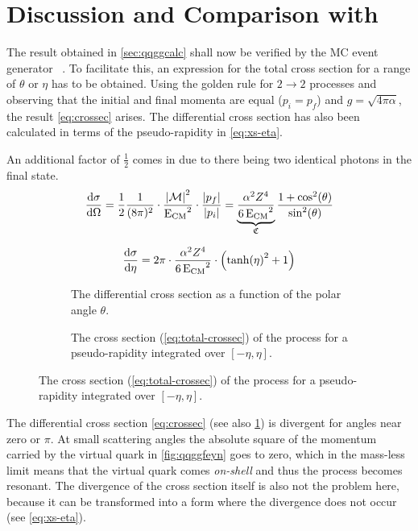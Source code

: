 \section{Discussion and Comparison with \sherpa}%
\label{sec:compsher}

The result obtained in \cref{sec:qqggcalc} shall now be verified by the
MC event generator \sherpa{}~\cite{Gleisberg:2008ta}. To
facilitate this, an expression for the total cross section for a range
of \(\theta\) or \(\eta\) has to be obtained. Using the golden rule
for \(2\rightarrow 2\) processes and observing that the initial and
final momenta are equal (\(p_i=p_f\)) and \(g=\sqrt{4\pi\alpha}\), the
result \cref{eq:crossec} arises. The differential cross section has
also been calculated in terms of the pseudo-rapidity
in \cref{eq:xs-eta}.

An additional factor of \(\frac{1}{2}\) comes in due to there being
two identical photons in the final state.
\begin{equation}
  \label{eq:crossec}
  \dv{\sigma}{\Omega} =
  \frac{1}{2}\frac{1}{(8\pi)^2}\cdot\frac{\abs{\mathcal{M}}^2}{\operatorname{E_{\text{CM}}}^2}\cdot\frac{\abs{p_f}}{\abs{p_i}}
  = \underbrace{\frac{\alpha^2Z^4}{6\operatorname{E_{\text{CM}}}^2}}_{\mathfrak{C}}\frac{1+\cos^2(\theta)}{\sin^2(\theta)}
\end{equation}

\begin{equation}
  \label{eq:xs-eta}
  \dv{\sigma}{\eta} = 2\pi\cdot\frac{\alpha^2Z^4}{6\operatorname{E_{\text{CM}}}^2}\cdot\qty(\tanh(\eta)^2 + 1)
\end{equation}

\begin{figure}[ht]
  \centering
  \begin{subfigure}[c]{.45\textwidth}
    \centering {}
    \caption[Plot of the differential cross section of the \(\qqgg\)
    process.]{\label{fig:diffxs} The differential cross section as a
      function of the polar angle \(\theta\). }
  \end{subfigure}
  \begin{subfigure}[c]{.45\textwidth}
  \centering
  \caption[Plot of the total cross section of the \(\qqgg\)
  process.]{\label{fig:totxs} The cross section
    (\cref{eq:total-crossec}) of the process for a pseudo-rapidity
    integrated over \([-\eta, \eta]\).}
  \end{subfigure}
\end{figure}

The differential cross section \cref{eq:crossec} (see also
\cref{fig:diffxs}) is divergent for angles near zero or \(\pi\). At
small scattering angles the absolute square of the momentum carried by
the virtual quark in \cref{fig:qqggfeyn} goes to zero, which in the
mass-less limit means that the virtual quark comes \emph{on-shell} and
thus the process becomes resonant. The divergence of the cross section
itself is also not the problem here, because it can be transformed
into a form where the divergence does not occur (see
\cref{eq:xs-eta}).

